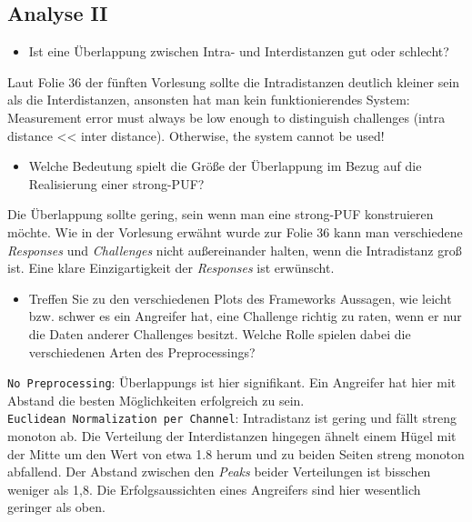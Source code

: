 \subsection{Analyse II}
\begin{itemize}
    \item Ist eine Überlappung zwischen Intra- und 
    Interdistanzen gut oder schlecht?
\end{itemize}

Laut Folie 36 der fünften Vorlesung sollte die 
Intradistanzen deutlich kleiner sein als die 
Interdistanzen, ansonsten hat man kein 
funktionierendes System: \glqq Measurement error 
must always be low enough 
to distinguish challenges (intra distance << inter 
distance). Otherwise, the system cannot be used!\grqq

\begin{itemize}
    \item Welche Bedeutung spielt die Größe der 
    Überlappung im Bezug auf die Realisierung einer
    strong-PUF?
\end{itemize}

Die Überlappung sollte gering, sein wenn man eine 
strong-PUF konstruieren möchte. Wie in der Vorlesung
erwähnt wurde zur Folie 36 kann man verschiedene
\textit{Responses} und \textit{Challenges} nicht 
außereinander halten, wenn die Intradistanz groß 
ist. Eine klare Einzigartigkeit der \textit{Responses}
ist erwünscht.


\begin{itemize}
    \item Treffen Sie zu den verschiedenen 
    Plots des Frameworks Aussagen, wie leicht 
    bzw. schwer es ein Angreifer hat, eine 
    Challenge richtig zu raten, wenn er nur 
    die Daten anderer Challenges besitzt. 
    Welche Rolle spielen dabei die 
    verschiedenen Arten des Preprocessings?
\end{itemize}


\verb|No Preprocessing|:
Überlappungs ist hier signifikant. Ein Angreifer hat hier 
mit Abstand die besten Möglichkeiten erfolgreich zu sein.\\


\verb|Euclidean Normalization per Channel|: Intradistanz 
ist gering und fällt streng monoton ab. Die Verteilung der
Interdistanzen hingegen ähnelt einem Hügel mit der Mitte um 
den Wert von etwa 1.8 herum und zu beiden Seiten streng 
monoton abfallend. Der Abstand zwischen den \textit{Peaks} 
beider  Verteilungen ist bisschen weniger als 1,8. Die 
Erfolgsaussichten eines Angreifers sind hier wesentlich 
geringer als oben.\\


